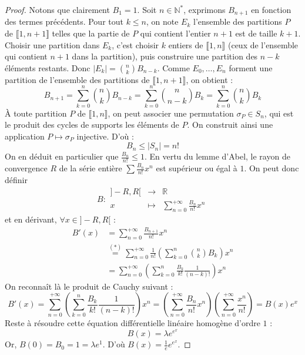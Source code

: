   \begin{proof}
    Notons que clairement $B_1 = 1$. Soit $n \in \mathbb{N}^*$, exprimons $B_{n+1}$ en fonction des termes précédents. Pour tout $k \leq n$, on note $E_k$ l'ensemble des partitions $P$ de $\llbracket 1, n+1 \rrbracket$ telles que la partie de $P$ qui contient l'entier $n+1$ est de taille $k+1$. Choisir une partition dans $E_k$, c'est choisir $k$ entiers de $\llbracket 1, n \rrbracket$ (ceux de l'ensemble qui contient $n+1$ dans la partition), puis construire une partition des $n-k$ éléments restants. Donc $|E_k| = \binom{n}{k} B_{n-k}$.
    \newpar
    Comme $E_0, \dots, E_n$ forment une partition de l'ensemble des partitions de $\llbracket 1, n+1 \rrbracket$, on obtient :
    \[ B_{n+1} = \sum_{k=0}^n \binom{n}{k} B_{n-k} = \sum_{k=0}^n \binom{n}{n-k} B_k = \sum_{k=0}^n \binom{n}{k} B_k \tag{$*$} \]
    À toute partition $P$ de $\llbracket 1, n \rrbracket$, on peut associer une permutation $\sigma_P \in S_n$, qui est le produit des cycles de supports les éléments de $P$. On construit ainsi une application $P \mapsto \sigma_P$ injective. D'où :
    \[ B_n \leq |S_n| = n! \]
    On en déduit en particulier que $\frac{B_n}{n!} \leq 1$. En vertu du lemme d'Abel, le rayon de convergence $R$ de la série entière $\sum \frac{B_n}{n!} x^n$ est supérieur ou égal à $1$. On peut donc définir
    \[
    B :
    \begin{array}{ccc}
      ]-R,R[ &\rightarrow& \mathbb{R} \\
      x &\mapsto& \sum_{n=0}^{+\infty} \frac{B_n}{n!} x^n
    \end{array}
    \]
    et en dérivant, $\forall x \in ]-R,R[$ :
    \begin{align*}
      B'(x) &= \sum_{n=0}^{+\infty} \frac{B_{n+1}}{n!} x^n \\
      &\overset{(*)}{=} \sum_{n=0}^{+\infty} \frac{1}{n!} \left( \sum_{k=0}^n \binom{n}{k} B_k \right) x^n \\
      &= \sum_{n=0}^{+\infty} \left( \sum_{k=0}^n \frac{B_k}{k!} \frac{1}{(n-k)!} \right) x^n
    \end{align*}
    On reconnaît là le produit de Cauchy suivant :
    \[ B'(x) = \sum_{n=0}^{+\infty} \left( \sum_{k=0}^n \frac{B_k}{k!} \frac{1}{(n-k)!} \right) x^n = \left( \sum_{n=0}^{+\infty} \frac{B_n}{n!} x^n \right) \left( \sum_{n=0}^{+\infty} \frac{x^n}{n!} \right) = B(x) e^x \]
    Reste à résoudre cette équation différentielle linéaire homogène d'ordre $1$ :
    \[ B(x) = \lambda e^{e^x} \]
    Or, $B(0) = B_0 = 1 = \lambda e^1$. D'où $B(x) = \frac{1}{e} e^{e^x}$.

\end{proof}
